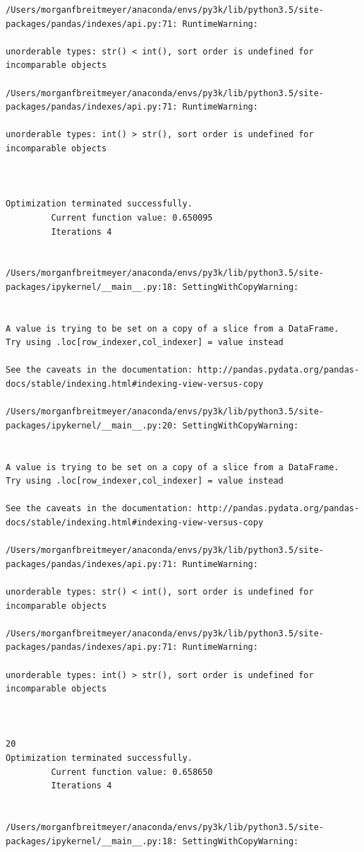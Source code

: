 \begin{lstlisting}
/Users/morganfbreitmeyer/anaconda/envs/py3k/lib/python3.5/site-packages/pandas/indexes/api.py:71: RuntimeWarning:

unorderable types: str() < int(), sort order is undefined for incomparable objects

/Users/morganfbreitmeyer/anaconda/envs/py3k/lib/python3.5/site-packages/pandas/indexes/api.py:71: RuntimeWarning:

unorderable types: int() > str(), sort order is undefined for incomparable objects



Optimization terminated successfully.
         Current function value: 0.650095
         Iterations 4


/Users/morganfbreitmeyer/anaconda/envs/py3k/lib/python3.5/site-packages/ipykernel/__main__.py:18: SettingWithCopyWarning:


A value is trying to be set on a copy of a slice from a DataFrame.
Try using .loc[row_indexer,col_indexer] = value instead

See the caveats in the documentation: http://pandas.pydata.org/pandas-docs/stable/indexing.html#indexing-view-versus-copy

/Users/morganfbreitmeyer/anaconda/envs/py3k/lib/python3.5/site-packages/ipykernel/__main__.py:20: SettingWithCopyWarning:


A value is trying to be set on a copy of a slice from a DataFrame.
Try using .loc[row_indexer,col_indexer] = value instead

See the caveats in the documentation: http://pandas.pydata.org/pandas-docs/stable/indexing.html#indexing-view-versus-copy

/Users/morganfbreitmeyer/anaconda/envs/py3k/lib/python3.5/site-packages/pandas/indexes/api.py:71: RuntimeWarning:

unorderable types: str() < int(), sort order is undefined for incomparable objects

/Users/morganfbreitmeyer/anaconda/envs/py3k/lib/python3.5/site-packages/pandas/indexes/api.py:71: RuntimeWarning:

unorderable types: int() > str(), sort order is undefined for incomparable objects



20
Optimization terminated successfully.
         Current function value: 0.658650
         Iterations 4


/Users/morganfbreitmeyer/anaconda/envs/py3k/lib/python3.5/site-packages/ipykernel/__main__.py:18: SettingWithCopyWarning:



\end{lstlisting}
